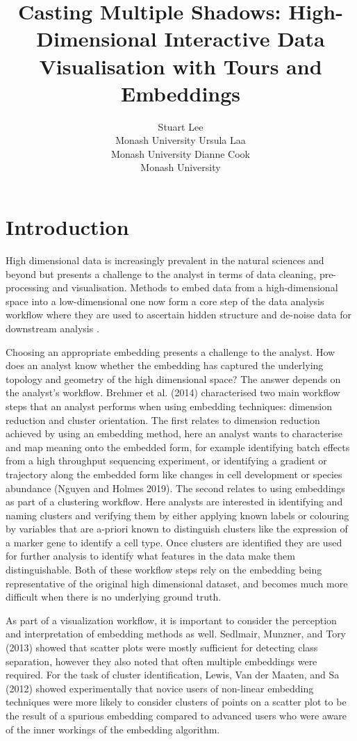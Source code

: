 \documentclass[article,notitle]{jdssv}
\author{
Stuart Lee\\Monash University \And Ursula Laa\\Monash University \And Dianne Cook\\Monash University
}
\title{Casting Multiple Shadows: High-Dimensional Interactive Data Visualisation with Tours and Embeddings}
\begin{document}
\hypertarget{introduction}{%
\section{Introduction}\label{introduction}}

High dimensional data is increasingly prevalent in the natural sciences and
beyond but presents a challenge to the analyst in terms of data cleaning,
pre-processing and visualisation. Methods to embed data from a high-dimensional
space into a low-dimensional one now form a core step of the data analysis
workflow where they are used to ascertain hidden structure and de-noise data
for downstream analysis .

Choosing an appropriate embedding presents a challenge to the analyst. How does
an analyst know whether the embedding has captured the underlying topology and
geometry of the high dimensional space? The answer depends on the analyst's
workflow. Brehmer et al. (2014) characterised two main workflow steps that an
analyst performs when using embedding techniques: dimension reduction and
cluster orientation. The first relates to dimension reduction achieved by using
an embedding method, here an analyst wants to characterise and map meaning onto
the embedded form, for example identifying batch effects from a high throughput
sequencing experiment, or identifying a gradient or trajectory along the
embedded form like changes in cell development or species abundance (Nguyen and Holmes 2019). The second relates to using embeddings as part of
a clustering workflow. Here analysts are interested in identifying and naming
clusters and verifying them by either applying known labels or colouring by
variables that are a-priori known to distinguish clusters like the expression of a marker gene to identify a cell type. Once clusters are identified they are used for further analysis to identify what features in the data make them distinguishable. Both of these
workflow steps rely on the embedding being representative of the original high dimensional dataset, and becomes much more difficult when there is no underlying ground truth.

As part of a visualization workflow, it is important to consider the perception
and interpretation of embedding methods as well. Sedlmair, Munzner, and Tory (2013) showed that
scatter plots were mostly sufficient for detecting class separation, however
they also noted that often multiple embeddings were required. For the task of
cluster identification, Lewis, Van der Maaten, and Sa (2012) showed experimentally that novice users
of non-linear embedding techniques were more likely to consider clusters of
points on a scatter plot to be the result of a spurious embedding compared
to advanced users who were aware of the inner workings of the embedding
algorithm.
\end{document}
